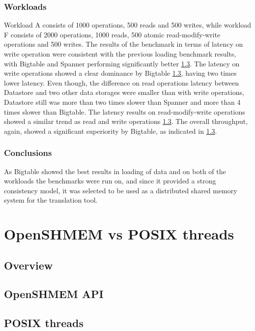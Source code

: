 \documentclass[bsc,frontabs,twoside,singlespacing,parskip,deptreport]{infthesis}     %
\begin{document}
\subsection{Workloads}

Workload A consists of 1000 operations, 500 reads and 500 writes, while workload F consists of 2000 operations, 1000 reads, 500 atomic read-modify-write operations and 500 writes. The results of the benchmark in terms of latency on write operation were consistent with the previous loading benchmark results, with Bigtable and Spanner performing significantly better \ref{}. The latency on write operations showed a clear dominance by Bigtable \ref{}, having two times lower latency. Even though, the difference on read operations latency between Datastore and two other data storages were smaller than with write operations, Datastore still was more than two times slower than Spanner and more than 4 times slower than Bigtable. The latency results on read-modify-write operations showed a similar trend as read and write operations \ref{}. The overall throughput, again, showed a significant superiority by Bigtable, as indicated in \ref{}. 


\subsection{Conclusions}

As Bigtable showed the best results in loading of data and on both of the workloads the benchmarks were run on, and since it provided a strong consistency model, it was selected to be used as a distributed shared memory system for the translation tool.

\chapter{OpenSHMEM vs POSIX threads}

\section{Overview}

\section{OpenSHMEM API}

\section{POSIX threads}
\end{document}
